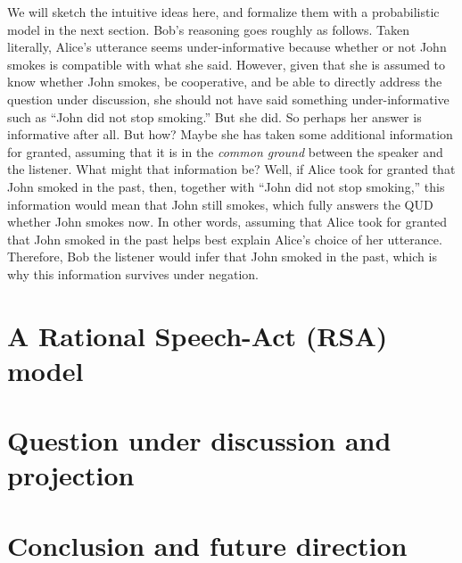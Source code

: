 \documentclass[10pt,letterpaper]{article}
\begin{document}
We will sketch the intuitive ideas here, and formalize them with a probabilistic model in the next section. 
Bob's reasoning goes roughly as follows. 
Taken literally, Alice's utterance seems under-informative because whether or not
 John smokes is compatible with what she said.
However, given that she is assumed to know whether John smokes, be cooperative, and
 be able to directly address the question under discussion, 
 she should not have said something under-informative such as ``John did not stop smoking.''
But she did. 
So perhaps her answer is informative after all.
But how?
Maybe she has taken some additional information for granted, assuming that it is in 
 the \emph{common ground} between the speaker and the listener.
What might that information be?
Well, if Alice took for granted that John smoked in the past, then, 
  together with ``John did not stop smoking,'' this information would mean that 
 John still smokes, which fully answers the QUD whether John smokes now.
In other words, assuming that Alice took for granted that John smoked in the past 
 helps best explain Alice's choice of her utterance. 
Therefore, Bob the listener would infer that John smoked in the past, which is why 
 this information survives under negation.
 
 

\section{A Rational Speech-Act (RSA) model}
\label{sec:RSA}


\section{Question under discussion and projection}
\label{sec:Discussion}


\section{Conclusion and future direction}
\label{sec:Conclusion}









\setlength{\bibleftmargin}{.125in}
\setlength{\bibindent}{-\bibleftmargin}


\end{document}
